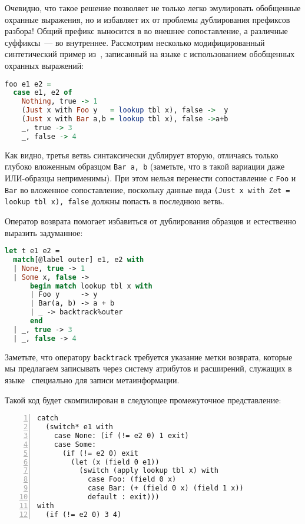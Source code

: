 Очевидно, что такое решение позволяет не только легко эмулировать обобщенные охранные выражения, но и избавляет их от проблемы дублирования префиксов разбора! Общий префикс выносится в во внешнее сопоставление, а различные суффиксы~--- во внутреннее. Рассмотрим несколько модифицированный синтетический пример из~\cite{discuss}, записанный на языке \Haskell{} с использованием обобщенных охранных выражений:

\noindent
\begin{minipage}{\linewidth}
\begin{lstlisting}[language=haskell, escapechar=@]
foo e1 e2 = 
  case e1, e2 of
    Nothing, true -> 1
    (Just x with Foo y   = lookup tbl x), false ->  y
    (Just x with Bar a,b = lookup tbl x), false ->a+b
    _, true -> 3
    _, false -> 4
\end{lstlisting}
\end{minipage}

Как видно, третья ветвь синтаксически дублирует вторую, отличаясь только глубоко вложенным образцом \lstinline[breaklines]|Bar a, b| (заметьте, что в такой вариации даже ИЛИ-образцы неприменимы). При этом нельзя перенести сопоставление с \lstinline|Foo| и \lstinline|Bar| во вложенное сопоставление, поскольку данные вида \lstinline[breaklines=true,language=none]|(Just x with Zet = lookup tbl x), false| \linebreak должны попасть в последнюю ветвь.

Оператор возврата помогает избавиться от дублирования образцов и естественно выразить задуманное:

\noindent
\begin{minipage}{\linewidth}
\begin{lstlisting}[language=ocaml]
let t e1 e2 = 
  match[@label outer] e1, e2 with
  | None, true -> 1
  | Some x, false ->
      begin match lookup tbl x with
      | Foo y     -> y
      | Bar(a, b) -> a + b
      | _ -> backtrack%outer
      end
  | _, true -> 3
  | _, false -> 4
\end{lstlisting}
\end{minipage}

Заметьте, что оператору \lstinline|backtrack| требуется указание метки возврата, которые мы предлагаем записывать через систему атрибутов и расширений, служащих в языке \ocaml~специально для записи метаинформации.

Такой код будет скомпилирован в следующее промежуточное представление:

\begin{minipage}{\linewidth}
\begin{lstlisting}[language=lambda, numbers=left]
catch
  (switch* e1 with 
    case None: (if (!= e2 0) 1 exit) 
    case Some:
      (if (!= e2 0) exit 
        (let (x (field 0 e1))
          (switch (apply lookup tbl x) with
            case Foo: (field 0 x)
            case Bar: (+ (field 0 x) (field 1 x))
            default : exit)))
with
  (if (!= e2 0) 3 4)
\end{lstlisting}
\end{minipage}

